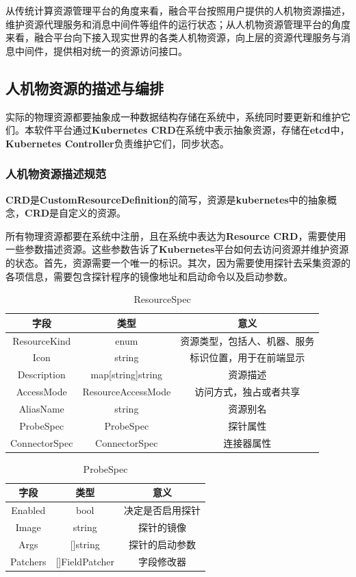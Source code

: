 \documentclass[a4paper, 12pt]{article}
\theoremstyle{definition}
\begin{document}
从传统计算资源管理平台的角度来看，融合平台按照用户提供的人机物资源描述，维护资源代理服务和消息中间件等组件的运行状态；从人机物资源管理平台的角度来看，融合平台向下接入现实世界的各类人机物资源，向上层的资源代理服务与消息中间件，提供相对统一的资源访问接口。

\subsection{人机物资源的描述与编排}
实际的物理资源都要抽象成一种数据结构存储在系统中，系统同时要更新和维护它们。本软件平台通过\textbf{Kubernetes CRD}在系统中表示抽象资源，存储在\textbf{etcd}中，\textbf{Kubernetes Controller}负责维护它们，同步状态。
\subsubsection{人机物资源描述规范}
\textbf{CRD}是\textbf{CustomResourceDefinition}的简写，资源是\textbf{kubernetes}中的抽象概念，\textbf{CRD}是自定义的资源。

所有物理资源都要在系统中注册，且在系统中表达为\textbf{Resource CRD}，需要使用一些参数描述资源。这些参数告诉了\textbf{Kubernetes}平台如何去访问资源并维护资源的状态。首先，资源需要一个唯一的标识。其次，因为需要使用探针去采集资源的各项信息，需要包含探针程序的镜像地址和启动命令以及启动参数。


\begin{table}[!htbp]
\centering
\begin{tabular}{ccc}
  \toprule
  字段& 类型& 意义\\
  \midrule
  ResourceKind& enum& 资源类型，包括人、机器、服务\\
  Icon& string& 标识位置，用于在前端显示\\
  Description& map[string]string& 资源描述\\
  AccessMode& ResourceAccessMode& 访问方式，独占或者共享\\
  AliasName& string& 资源别名\\
  ProbeSpec& ProbeSpec& 探针属性\\
  ConnectorSpec& ConnectorSpec& 连接器属性\\
  \bottomrule
\end{tabular}
\caption{ResourceSpec}
\end{table}

\begin{table}[!htbp]
\centering
\begin{tabular}{ccc}
  \toprule
  字段& 类型& 意义\\
  \midrule
  Enabled& bool& 决定是否启用探针\\
  Image& string& 探针的镜像\\
  Args& []string& 探针的启动参数\\
  Patchers& []FieldPatcher& 字段修改器\\
  \bottomrule
\end{tabular}
\caption{ProbeSpec}
\end{table}
\end{document}
